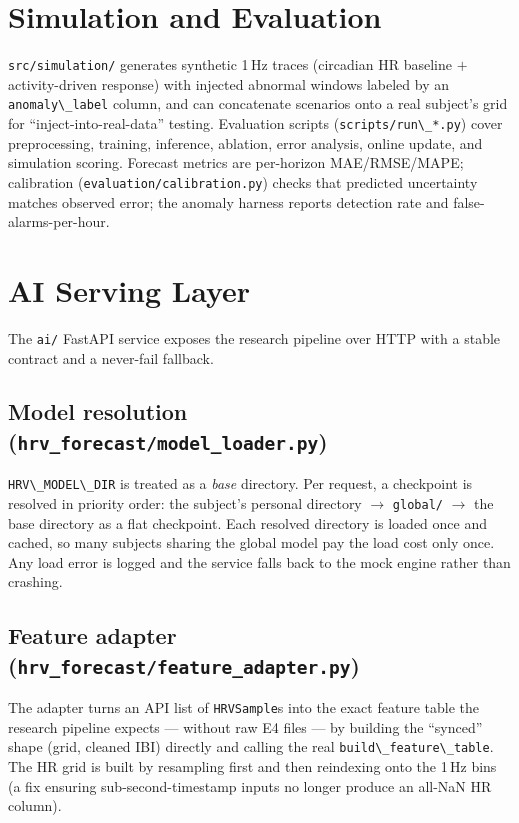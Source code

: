 \documentclass[11pt,a4paper]{article}
\newcommand{\code}[1]{\lstinline[basicstyle=\ttfamily\normalsize]!#1!}
\begin{document}
\section{Simulation and Evaluation}

\code{src/simulation/} generates synthetic 1\,Hz traces (circadian HR baseline
$+$ activity-driven response) with injected abnormal windows labeled by an
\code{anomaly\_label} column, and can concatenate scenarios onto a real subject's
grid for ``inject-into-real-data'' testing. Evaluation scripts
(\code{scripts/run\_*.py}) cover preprocessing, training, inference, ablation,
error analysis, online update, and simulation scoring. Forecast metrics are
per-horizon MAE/RMSE/MAPE; calibration (\code{evaluation/calibration.py})
checks that predicted uncertainty matches observed error; the anomaly harness
reports detection rate and false-alarms-per-hour.

\section{AI Serving Layer}\label{sec:aiservice}

The \code{ai/} FastAPI service exposes the research pipeline over HTTP with a
stable contract and a never-fail fallback.

\subsection{Model resolution (\texttt{hrv\_forecast/model\_loader.py})}
\code{HRV\_MODEL\_DIR} is treated as a \emph{base} directory. Per request, a
checkpoint is resolved in priority order: the subject's personal directory
$\rightarrow$ \code{global/} $\rightarrow$ the base directory as a flat
checkpoint. Each resolved directory is loaded once and cached, so many subjects
sharing the global model pay the load cost only once. Any load error is logged
and the service falls back to the mock engine rather than crashing.

\subsection{Feature adapter (\texttt{hrv\_forecast/feature\_adapter.py})}
The adapter turns an API list of \code{HRVSample}s into the exact feature table
the research pipeline expects --- without raw E4 files --- by building the
``synced'' shape (grid, cleaned IBI) directly and calling the real
\code{build\_feature\_table}. The HR grid is built by resampling first and then
reindexing onto the 1\,Hz bins (a fix ensuring sub-second-timestamp inputs no
longer produce an all-NaN HR column).
\end{document}
